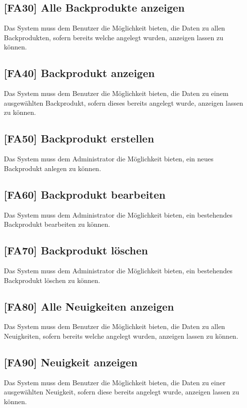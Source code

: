 \subsection{[FA30] Alle Backprodukte anzeigen} \label{fa30}
Das System muss dem Benutzer die Möglichkeit bieten, die Daten zu allen Backprodukten, sofern bereits welche angelegt wurden, anzeigen lassen zu können.

\subsection{[FA40] Backprodukt anzeigen} \label{fa40}
Das System muss dem Benutzer die Möglichkeit bieten, die Daten zu einem ausgewählten Backprodukt, sofern dieses bereits angelegt wurde, anzeigen lassen zu können.

\subsection{[FA50] Backprodukt erstellen} \label{fa50}
Das System muss dem Administrator die Möglichkeit bieten, ein neues Backprodukt anlegen zu können.

\subsection{[FA60] Backprodukt bearbeiten} \label{fa60}
Das System muss dem Administrator die Möglichkeit bieten, ein bestehendes Backprodukt bearbeiten zu können.

\subsection{[FA70] Backprodukt löschen} \label{fa70}
Das System muss dem Administrator die Möglichkeit bieten, ein bestehendes Backprodukt löschen zu können.

\subsection{[FA80] Alle Neuigkeiten anzeigen} \label{fa80}
Das System muss dem Benutzer die Möglichkeit bieten, die Daten zu allen Neuigkeiten, sofern bereits welche angelegt wurden, anzeigen lassen zu können.

\subsection{[FA90] Neuigkeit anzeigen} \label{fa90}
Das System muss dem Benutzer die Möglichkeit bieten, die Daten zu einer ausgewählten Neuigkeit, sofern diese bereits angelegt wurde, anzeigen lassen zu können.

